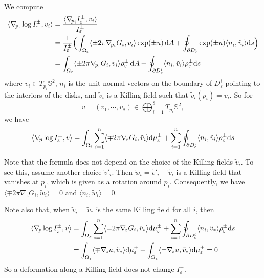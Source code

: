 \documentclass[a4paper]{amsart}
\newcommand{\uS}{\mathbb{S}}
\newcommand{\dd}{{\rm d}}
\theoremstyle{plain} %
\theoremstyle{definition} %
\theoremstyle{remark}
\begin{document}
We compute
\begin{align*}
	\langle \nabla_{\! p_i} \log I^\pm_\varepsilon, v_i\rangle &=
	\frac{\langle \nabla_{\! p_i} I^\pm_\varepsilon, v_i\rangle}{I^\pm_\varepsilon}
	\\ &=
	\frac{1}{I^\pm_\varepsilon}
	\Big(
		\int_{\Omega_\varepsilon} \langle \pm 2\pi \nabla_{\! p_i} G_i, v_i \rangle \exp(\pm u) \, \dd A
		+ \oint_{\partial D^i_\varepsilon} \exp(\pm u) \langle n_i, \tilde v_i \rangle \dd s
	\Big)
	\\ &=
	\int_{\Omega_\varepsilon} \langle \pm 2\pi \nabla_{\! p_i} G_i, v_i \rangle \rho_\varepsilon^\pm \, \dd A
	+ \oint_{\partial D^i_\varepsilon} \langle n_i, \tilde v_i \rangle \rho_\varepsilon^\pm \dd s
\end{align*}
where $v_i \in T_{p_i} \uS^2$, $n_i$ is the unit normal vectors on the boundary
of $D^i_\varepsilon$ pointing to the interiors of the disks, and $\tilde v_i$
is a Killing field such that $\tilde v_i (p_i) = v_i$. So for
\[
	v = (v_1, \cdots, v_8) \in \bigoplus_{i=1}^8 T_{p_i} \uS^2,
\]
we have
\begin{equation}\label{eq:grad}
	\langle \nabla_{\! p} \log I^\pm_\varepsilon, v\rangle 
	= \int_{\Omega_\varepsilon} \sum_{i=1}^n \langle \mp 2\pi \nabla_{\! z} G_i, \tilde v_i \rangle \dd\mu_\varepsilon^\pm
	+ \sum_{i=1}^n \oint_{\partial D^i_\varepsilon} \langle n_i, \tilde v_i \rangle \rho_\varepsilon^\pm \dd s
\end{equation}

Note that the formula does not depend on the choice of the Killing fields
$\tilde v_i$.  To see this, assume another choice $\tilde v'_i$.  Then $\tilde
w_i = \tilde v'_i - \tilde v_i$ is a Killing field that vanishes at $p_i$,
which is given as a rotation around $p_i$.  Consequently, we have $\langle \mp
2\pi \nabla_{\! z} G_i, \tilde w_i \rangle = 0$ and $\langle n_i, \tilde w_i
\rangle = 0$.

Note also that, when $\tilde v_i = \tilde v_*$ is the same Killing field for
all $i$, then
\begin{align*}
	\langle \nabla_{\! p} \log I^\pm_\varepsilon, v\rangle 
	&= \int_{\Omega_\varepsilon} \sum_{i=1}^n \langle \mp 2\pi \nabla_{\! z} G_i, \tilde v_* \rangle \dd\mu_\varepsilon^\pm
	+ \sum_{i=1}^n \oint_{\partial D^i_\varepsilon} \langle n_i, \tilde v_* \rangle \rho_\varepsilon^\pm \dd s\\
	&= \int_{\Omega_\varepsilon} \langle \mp \nabla_{\! z} u, \tilde v_* \rangle \dd\mu_\varepsilon^\pm
	+ \int_{\Omega_\varepsilon} \langle \pm \nabla_{\! z} u, \tilde v_* \rangle \dd \mu_\varepsilon^\pm = 0
\end{align*}
So a deformation along a Killing field does not change $I^\pm_\varepsilon$.
\end{document}
